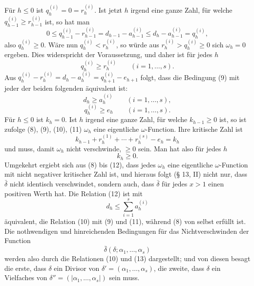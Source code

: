 Für $h\le0$ ist $q_h^{(i)}=0=r_h^{(i)}$. Ist jetzt $h$ irgend eine ganze Zahl, für welche $q_{h-1}^{(i)}\ge r_{h-1}^{(i)}$ ist, so hat man
\[
 0\le q_{h-1}^{(i)}-r_{h-1}^{(i)}=d_{h-1}-a_{h-1}^{(i)}\le d_h-a_{h-1}^{(i)}=q_h^{(i)},
\]
also $q_h^{(i)}\ge0$. Wäre nun $q_h^{(i)}<r_h^{(i)}$, so würde aus $r_h^{(i)}>q_h^{(i)}\ge0$ sich $\omega_h=0$ ergeben. Dies widerspricht der Voraussetzung, und daher ist für jedes $h$
\begin{equation}
 q_h^{(i)}\ge r_h^{(i)}\qquad(i=1,
\ldots,s).
\tag{9}
\end{equation}
Aus $q_h^{(i)}-r_h^{(i)}=d_h-a_h^{(i)}=q_{h+1}^{(i)}-e_{h+1}$ folgt, dass die Bedingung (9) mit jeder der beiden folgenden äquivalent ist:
\begin{equation}
 d_h\ge a_h^{(i)}\qquad(i=1,
\ldots,s),
\tag{10}
\end{equation}
\begin{equation}
 q_h^{(i)}\ge e_h\qquad(i=1,
\ldots,s).
\tag{11}
\end{equation}
Für $h\le0$ ist $k_h=0$. Ist $h$ irgend eine ganze Zahl, für welche $k_{h-1}\ge0$ ist, so ist zufolge (8), (9), (10), (11) $\omega_h$ eine eigentliche $\omega$-Function. Ihre kritische Zahl ist
\[
 k_{h-1}+r_h^{(1)}+\cdots+r_h^{(s)}-e_h=k_h
\]
und muss, damit $\omega_h$ nicht verschwinde, $\ge0$ sein. Man hat also für jedes $h$
\begin{equation}
 k_h\ge0.
\tag{12}
\end{equation}
Umgekehrt ergiebt sich aus (8) bis (12), dass jedes $\omega_h$ eine eigentliche $\omega$-Function mit nicht negativer kritischer Zahl ist, und hieraus folgt (§ 13, II) nicht nur, dass $\bar\delta$ nicht identisch verschwindet, sondern auch, dass $\bar\delta$ für jedes $x>1$ einen positiven Werth hat. Die Relation (12) ist mit
\begin{equation}
 d_h\le\sum_{i=1}^s a_h^{(i)}
\tag{13}
\end{equation}
äquivalent, die Relation (10) mit (9) und (11), während (8) von selbst erfüllt ist. Die nothwendigen und hinreichenden Bedingungen für das Nichtverschwinden der Function
\[
 \bar\delta(\delta;\alpha_1,
\ldots,\alpha_s)
\]
werden also durch die Relationen (10) und (13) dargestellt; und von diesen besagt die erste, dass $\delta$ ein Divisor von $\delta'=(\alpha_1,
\ldots,\alpha_s)$, die zweite, dass $\delta$ ein Vielfaches von $\delta''=(|\alpha_1,
\ldots,\alpha_s|)$ sein muss.

